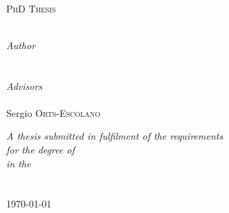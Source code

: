 \begin{titlepage}
\begin{center}

\textsc{\LARGE \univname}\\[1.5cm] %
\textsc{\Large PhD Thesis}\\[0.5cm] %

{\huge \bfseries \ttitle}\\[0.4cm] %
 
\begin{center} \large
\emph{Author}\\
{\authorname} %
\\\ \\
\emph{Advisors} \\
{\supname}\\ %
{Sergio \textsc{Orts-Escolano}}
\end{center}

\vfill
 
\large \textit{A thesis submitted in fulfilment of the requirements\\ for the degree of \degreename}\\[0.3cm] %
\textit{in the}\\[0.4cm]
\groupname\\\deptname\\[2cm] %
 
{\large \today}\\[4cm] %
 
\end{center}
\end{titlepage}

